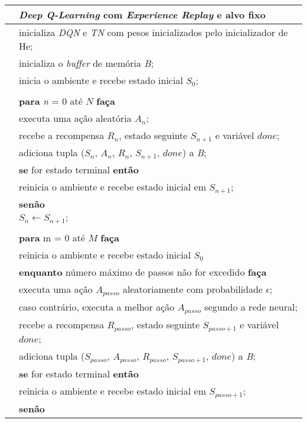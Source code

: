 \begin{tabular}{l l}

\hline
 & \textit{Deep Q-Learning} com \textit{Experience Replay} e alvo fixo\\
\hline

 & inicializa \textit{DQN} e \textit{TN} com pesos inicializados pelo inicializador de He;\\
 & inicializa o \textit{buffer} de memória \textit{B};\\
 & inicia o ambiente e recebe estado inicial $S_{0}$;\\
\\
 & \textbf{para} \textit{n} = 0 até $N$ \textbf{faça}\\
 & \qquad executa uma ação aleatória $A_{n}$;\\
 & \qquad recebe a recompensa $R_{n}$, estado seguinte $S_{n+1}$ e variável $done$;\\
 & \qquad adiciona tupla ($S_{n}$, $A_{n}$, $R_{n}$, $S_{n+1}$, $done$) a \textit{B};\\
 & \qquad \textbf{se} for estado terminal \textbf{então}\\
 & \qquad \qquad reinicia o ambiente e recebe estado inicial em $S_{n+1}$;\\
 & \qquad \textbf{senão}\\
 & \qquad \qquad $S_{n} \leftarrow S_{n+1};$ \\
\\
 & \textbf{para} m = 0 até $M$ \textbf{faça}\\
 & \qquad reinicia o ambiente e recebe estado inicial $S_{0}$\\
 & \qquad \textbf{enquanto} número máximo de passos não for excedido \textbf{faça}\\
 & \qquad \qquad executa uma ação $A_{passo}$ aleatoriamente com probabilidade $\epsilon$;\\
 & \qquad \qquad caso contrário, executa a melhor ação $A_{passo}$ segundo a rede neural;\\
 & \qquad \qquad recebe a recompensa $R_{passo}$, estado seguinte $S_{passo+1}$ e variável $done$;\\
 & \qquad \qquad adiciona tupla ($S_{passo}$, $A_{passo}$, $R_{passo}$, $S_{passo+1}$, $done$) a \textit{B};\\
 & \qquad \qquad \textbf{se} for estado terminal \textbf{então}\\
 & \qquad \qquad \qquad reinicia o ambiente e recebe estado inicial em $S_{passo+1}$;\\
 & \qquad \qquad \textbf{senão}\\

\end{tabular}
